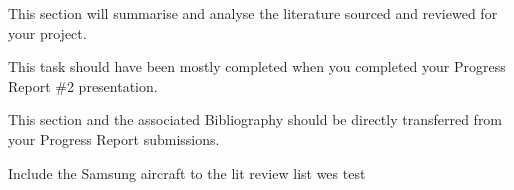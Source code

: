 This section will summarise and analyse the literature sourced and reviewed for your project.

This task should have been mostly completed when you completed your Progress Report \#2 presentation.

This section and the associated Bibliography should be directly transferred from your Progress Report submissions.

Include the Samsung aircraft to the lit review list wes test
